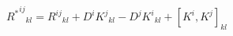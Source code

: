 \begin{equation}
{{R^{*}}^{ij}}_{kl}= {R^{ij}}_{kl}+ D^{i}{K^{j}}_{kl}-D^{j}{K^{i}}_{kl}+{[K^{i},K^{j}]}_{kl}
\label{4}
\end{equation}

